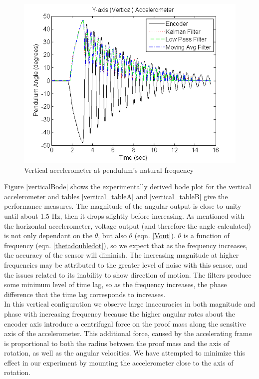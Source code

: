 \documentclass{article}
\theoremstyle{plain}
\theoremstyle{definition}
\theoremstyle{remark}
\begin{document}
\begin{figure}[hbt]
\begin{center}
\includegraphics[width = 12cm]{NormalMass_Vertical.png}
\caption{Vertical accelerometer at pendulum's natural frequency}
\label{normal_vertical}
\end{center}
\end{figure}

Figure \ref{verticalBode} shows the experimentally derived bode plot for the vertical accelerometer and tables \ref{vertical_tableA} and \ref{vertical_tableB} give the performance measures. The magnitude of the angular output is close to unity until about 1.5 Hz, then it drops slightly before increasing. As mentioned with the horizontal accelerometer, voltage output  (and therefore the angle calculated) is not only dependant on the $\theta$, but also $\ddot{\theta}$ (eqn. \ref{Vout}).  $\ddot{\theta}$ is a function of frequency (eqn. \ref{thetadoubledot}), so we expect that as the frequency increases, the accuracy of the sensor will diminish. The increasing magnitude at higher frequencies may be attributed to the greater level of noise with this sensor, and the issues related to its inability to show direction of motion. The filters produce some minimum level of time lag, so as the frequency increases, the phase difference that the time lag corresponds to increases. \\

In this vertical configuration we observe large inaccuracies in both magnitude and phase with increasing frequency because the higher angular rates about the encoder axis introduce a centrifugal force on the proof mass along the sensitive axis of the accelerometer.  This additional force, caused by the accelerating frame is proportional to both the radius between the proof mass and the axis of rotation, as well as the angular velocities.  We have attempted to minimize this effect in our experiment by mounting the accelerometer close to the axis of rotation.  
\end{document}
